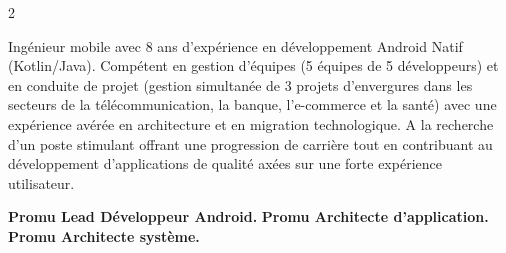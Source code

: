 \documentclass[10pt,a4paper,withhyper]{altacv}
\begin{document}


\makecvheader



\begin{paracol}{2}
	

{
Ingénieur mobile avec 8 ans d’expérience en développement Android Natif (Kotlin/Java). \newline Compétent en gestion d’équipes (5 équipes de 5 développeurs) et en conduite de projet (gestion simultanée de 3 projets d’envergures dans les secteurs de la télécommunication, la banque, l’e-commerce et la santé) avec une expérience avérée en architecture et en migration technologique. \newline A la recherche d’un poste stimulant offrant une progression de carrière tout en contribuant au développement d’applications de qualité axées sur une forte expérience utilisateur.
}



\textbf{Promu Lead Développeur Android.}
\newline
\textbf{Promu Architecte d’application.}
\newline
\textbf{Promu Architecte système.}
\newline


\end{paracol}
\end{document}
